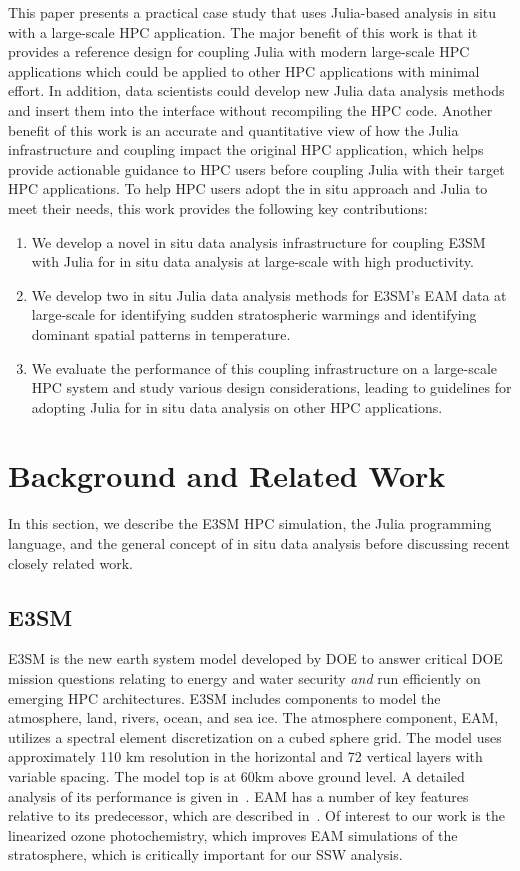 \documentclass{juliacon}
\begin{document}
This paper presents a practical case study that uses Julia-based analysis in situ with a large-scale HPC application. The major benefit of this work is that it provides a reference design for coupling Julia with modern large-scale HPC applications which could be applied to other HPC applications with minimal effort.
In addition, data scientists could develop new Julia data analysis methods and insert them into the interface without recompiling the HPC code.
Another benefit of this work is an accurate and quantitative view of how the Julia infrastructure and coupling impact the original HPC application, which helps provide actionable guidance to HPC users before coupling Julia with their target HPC applications. To help HPC users adopt the in situ approach and Julia to meet their needs, this work provides the following key contributions:
\begin{enumerate}
\item We develop a novel in situ data analysis infrastructure for coupling E3SM with Julia for in situ data analysis at large-scale with high productivity.
\item We develop two in situ Julia data analysis methods for E3SM's EAM data at large-scale for identifying sudden stratospheric warmings and identifying dominant spatial patterns in temperature.
\item We evaluate the performance of this coupling infrastructure on a large-scale HPC system and study various design considerations, leading to guidelines for adopting Julia for in situ data analysis on other HPC applications.
\end{enumerate}


\section{Background and Related Work}
In this section, we describe the E3SM HPC simulation, the Julia programming language, and the general concept of in situ data analysis before discussing recent closely related work.

\subsection{E3SM}

E3SM is the new earth system model developed by DOE to answer critical DOE mission questions relating to energy and water security \emph{and} run efficiently on emerging HPC architectures.  E3SM includes components to model the atmosphere, land, rivers, ocean, and sea ice. The atmosphere component, EAM, utilizes a spectral element discretization on a cubed sphere grid.  The model uses approximately 110 km resolution in the horizontal and 72 vertical layers with variable spacing.  The model top is at 60km above ground level.  A detailed analysis of its performance is given in~\cite{xie2018understanding,zhang2019evaluation,qian2018parametric,rasch2019overview,golaz2019doe}.  EAM has a number of key features relative to its predecessor, which are described in~\cite{golaz2019doe}.  Of interest to our work is the linearized ozone photochemistry, which improves EAM simulations of the stratosphere, which is critically important for our SSW analysis.
\end{document}
